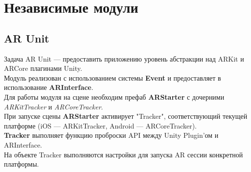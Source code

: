 \documentclass[a4paper, 11pt, titlepage]{article}
\begin{document}
{\begin{center}
      \end{center}
    }
  \section{Независимые модули}
    \subsection{AR Unit}
      Задача AR Unit --- предоставить приложению уровень абстракции над ARKit и ARCore плагинами Unity.\\
      Модуль реализован с использованием системы \textbf{Event} и предоставляет в использование \textbf{ARInterface}. \\
      Для работы модуля на сцене необходим префаб \textbf{ARStarter} с дочерними \textit{ARKitTracker} и 
      \textit{ARCoreTracker}. \\
      При запуске сцены \textbf{ARStarter} активирует "Tracker"{}, соответствующий текущей платформе (iOS ---  ARKitTracker, Android --- ARCoreTracker).\\
      \textbf{Tracker} выполняет функцию проброски API между Unity Plugin'ом и ARInterface. \\
      На объекте Tracker выполняются настройки для запуска AR сессии конкретной платформы.
\end{document}
